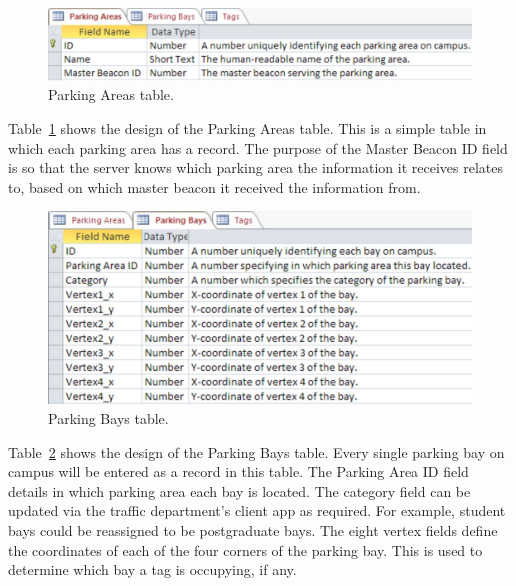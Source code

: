 
\begin{figure}[H]
\begin{center}
\includegraphics[scale=0.5]{data/software/5.jpg}
\caption{Parking Areas table.}
\label{fig:table-parking-areas}
\end{center}
\end{figure}

Table~\ref{fig:table-parking-areas} shows the design of the Parking Areas table. This is a simple table in which each parking area has a record. The purpose of the Master Beacon ID field is so that the server knows which parking area the information it receives relates to, based on which master beacon it received the information from.

\newpage
{}

\begin{figure}[H]
\begin{center}
\includegraphics[scale=0.5]{data/software/6.jpg}
\caption{Parking Bays table.}
\label{fig:table-parking-bays}
\end{center}
\end{figure}

Table~\ref{fig:table-parking-bays} shows the design of the Parking Bays table. Every single parking bay on campus will be entered as a record in this table. The Parking Area ID field details in which parking area each bay is located. The category field can be updated via the traffic department's client app as required. For example, student bays could be reassigned to be postgraduate bays. The eight vertex fields define the coordinates of each of the four corners of the parking bay. This is used to determine which bay a tag is occupying, if any.

